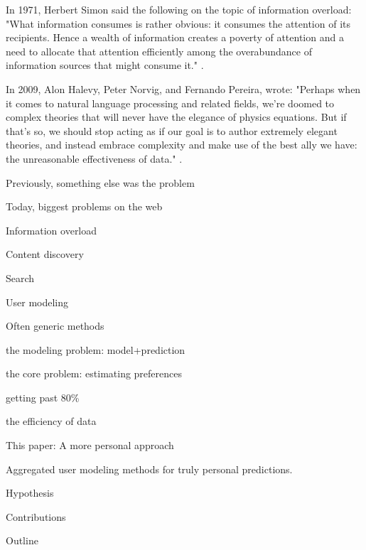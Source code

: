 In 1971, Herbert Simon said the following on the topic of information overload: 
"What information consumes is rather obvious: it consumes the attention of its recipients. 
Hence a wealth of information creates a poverty of attention and 
a need to allocate that attention efficiently among the overabundance of 
information sources that might consume it." \cite{Greenberger1971}.


In 2009, Alon Halevy, Peter Norvig, and Fernando Pereira, wrote:
"Perhaps when it comes to natural language processing and related fields, 
we’re doomed to complex theories that will never have the elegance of physics equations. 
But if that’s so, we should stop acting as if our goal is to author extremely elegant theories, 
and instead embrace complexity and make use of the best ally we have: 
the unreasonable effectiveness of data."
\cite{Halevy2009}.




Previously, something else was the problem

Today, biggest problems on the web

Information overload

Content discovery

Search

User modeling

Often generic methods

the modeling problem: model+prediction

the core problem: estimating preferences

getting past 80\%

the efficiency of data

This paper: A more personal approach

Aggregated user modeling methods for 
truly personal predictions.

Hypothesis

Contributions

Outline


